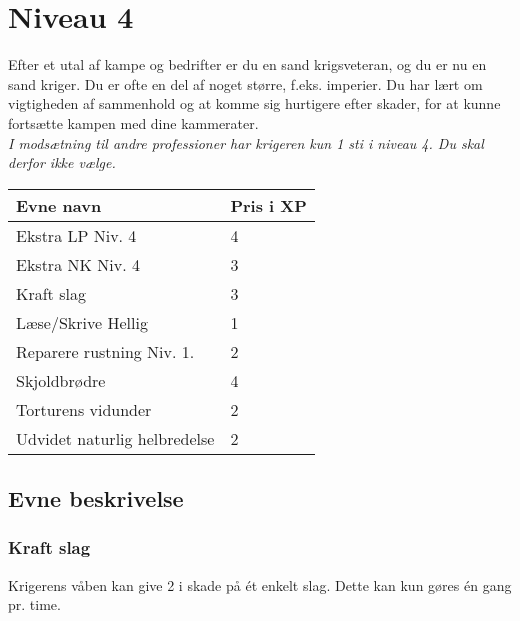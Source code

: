 \chapter{Niveau 4}

Efter et utal af kampe og bedrifter er du en sand krigsveteran, og du er nu en sand kriger. Du er ofte en del af noget større, f.eks. imperier. Du har lært om vigtigheden af sammenhold og at komme sig hurtigere efter skader, for at kunne fortsætte kampen med dine kammerater.\\
\emph{I modsætning til andre professioner har krigeren kun 1 sti i niveau 4. Du skal derfor ikke vælge.}\\

\begin{table}[H]
    \centering
    \begin{tabular}{|p{}|p{}|}
    \rowcolor{cerulean!80}\hline
        Evne navn & Pris i XP \\\hline
        Ekstra LP Niv. 4 & 4\\\hline
        Ekstra NK Niv. 4 & 3\\\hline
        Kraft slag & 3 \\\hline
        Læse/Skrive Hellig & 1 \\\hline
        Reparere rustning Niv. 1. & 2\\\hline
        Skjoldbrødre & 4\\\hline
        Torturens vidunder & 2\\\hline
        Udvidet naturlig helbredelse & 2 \\\hline
    \end{tabular}
\end{table}
\section{Evne beskrivelse}





\subsection{Kraft slag}
Krigerens våben kan give 2 i skade på ét enkelt slag. Dette kan kun gøres én gang pr. time.





